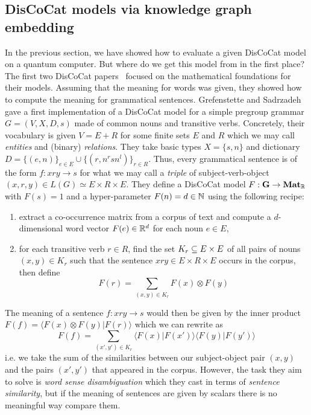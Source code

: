 
\subsection{DisCoCat models via knowledge graph embedding}\label{subsection:kge}

In the previous section, we have showed how to evaluate a given DisCoCat model on a quantum computer.
But where do we get this model from in the first place?
The first two DisCoCat papers~\cite{ClarkEtAl08,ClarkEtAl10} focused on the mathematical foundations for their models.
Assuming that the meaning for words was given, they showed how to compute the meaning for grammatical sentences.
Grefenstette and Sadrzadeh~\cite{GrefenstetteSadrzadeh11} gave a first implementation of a DisCoCat model for a simple pregroup grammar $G = (V, X, D, s)$ made of common nouns and transitive verbs.
Concretely, their vocabulary is given $V = E + R$ for some finite sets $E$ and $R$ which we may call \emph{entities} and (binary) \emph{relations}.
They take basic types $X = \{ s, n \}$ and dictionary $D = \{ (e, n) \}_{e \in E} \cup \{ (r, n^r s n^l) \}_{r \in R}$.
Thus, every grammatical sentence is of the form $f : x r y \to s$ for what we may call a \emph{triple} of subject-verb-object $(x, r, y) \in L(G) \simeq E \times R \times E$.
They define a DisCoCat model $F : \mathbf{G} \to \mathbf{Mat}_{\mathbb{R}}$ with $F(s) = 1$ and a hyper-parameter $F(n) = d \in \mathbb{N}$ using the following recipe:
\begin{enumerate}
\item extract a co-occurrence matrix from a corpus of text and compute a $d$-dimensional word vector $F(e) \in \mathbb{R}^d$ for each noun $e \in E$,
\item for each transitive verb $r \in R$, find the set $K_r \subseteq E \times E$ of all pairs of nouns $(x, y) \in K_r$ such that the sentence $x r y \in E \times R \times E$ occurs in the corpus, then define
$$F(r) = \sum_{(x, y) \in K_r} F(x) \otimes F(y)$$
\end{enumerate}
The meaning of a sentence $f : x r y \to s$ would then be given by the inner product $F(f) = \langle F(x) \otimes F(y) \vert F(r) \rangle$ which we can rewrite as
$$F(f) = \sum_{(x', y') \in K_r} \langle F(x) \vert F(x') \rangle \langle F(y) \vert F(y') \rangle$$
i.e. we take the sum of the similarities between our subject-object pair $(x, y)$ and the pairs $(x', y')$ that appeared in the corpus.
However, the task they aim to solve is \emph{word sense disambiguation} which they cast in terms of \emph{sentence similarity}, but if the meaning of sentences are given by scalars there is no meaningful way compare them.
